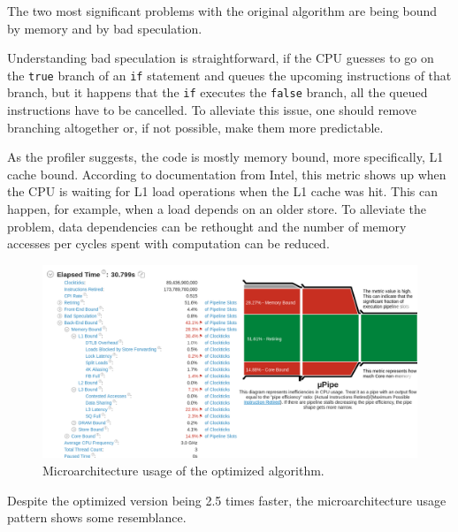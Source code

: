 \documentclass[12pt]{article}
\newcommand{\code}[1]{\texttt{#1}}
\begin{document}
The two most significant problems with the original algorithm are being bound by memory and by bad speculation.

Understanding bad speculation is straightforward, if the CPU guesses to go on the \code{true} branch of an \code{if} statement and queues the upcoming instructions of that branch, but it happens that the \code{if} executes the \code{false} branch, all the queued instructions have to be cancelled.\cite{intel_vtune_docs} To alleviate this issue, one should remove branching altogether or, if not possible, make them more predictable.

As the profiler suggests, the code is mostly memory bound, more specifically, L1 cache bound. According to documentation from Intel, this metric shows up when the CPU is waiting for L1 load operations when the L1 cache was hit. This can happen, for example, when a load depends on an older store. To alleviate the problem, data dependencies can be rethought and the number of memory accesses per cycles spent with computation can be reduced.\cite{intel_vtune_docs}

\begin{figure}[H]
	\begin{center}
		\includegraphics[width=\textwidth]{velout_uarch_overall_opt}
	\end{center}
	\caption{Microarchitecture usage of the optimized algorithm.}
	\label{fig_velout_uarch_overall_opt}
\end{figure}

Despite the optimized version being 2.5 times faster, the microarchitecture usage pattern shows some resemblance.
\end{document}
